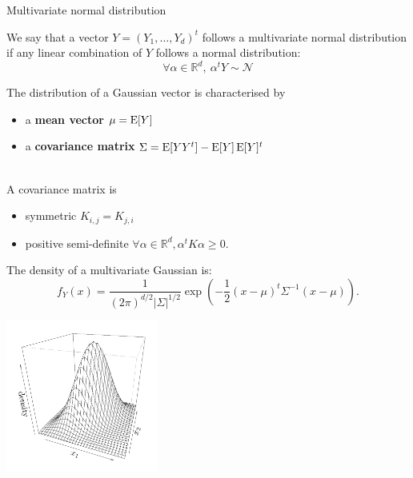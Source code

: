 \begin{frame}{Multivariate normal distribution}
\begin{definition}
	We say that a vector $Y=(Y_1, \dots, Y_d)^t$ follows a multivariate normal distribution if any linear combination of $Y$ follows a normal distribution:
	\begin{equation*}
		\forall \alpha \in \mathds{R}^d,\ \alpha^t Y \sim \mathcal{N}
	\end{equation*}
\end{definition}
The distribution of a Gaussian vector is characterised by
\begin{itemize}
 	\item a \textbf{mean vector} $\mu = \operatorname*{E} [Y]$
 	\item a \textbf{covariance matrix} $\Sigma = \operatorname*{E}[YY^t] - \operatorname*{E}[Y] \operatorname*{E}[Y]^t$ %
\end{itemize}
\vspace{3mm}
\\
A covariance matrix is
\begin{itemize}
	\item symmetric $K_{i,j}=K_{j,i}$
	\item positive semi-definite $\forall \alpha \in \mathds{R}^d, \alpha^t K \alpha \geq 0$.
\end{itemize}
\end{frame}

\begin{frame}{}
The density of a multivariate Gaussian is:
\begin{equation*}
f_Y(x) = \frac{1}{\displaystyle (2 \pi)^{d/2} |\Sigma|^{1/2}} \exp \left(-\frac12 (x-\mu)^t \Sigma^{-1} (x-\mu)  \right).
\end{equation*}
\begin{center}
 \includegraphics[height=5cm]{1_stat_models/figures/R/MVN_dens2}
\end{center}
\end{frame}


